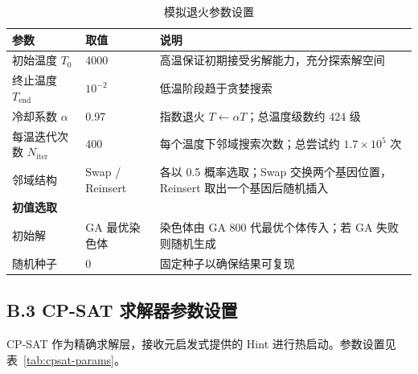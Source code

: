 \documentclass[12pt,a4paper]{ctexart}
\begin{document}
\begin{table}[H]
\centering
\caption{模拟退火参数设置}\label{tab:sa-params}
\begin{tabular}{p{4.5cm} p{3.5cm} p{6.5cm}}
\toprule
\textbf{参数} & \textbf{取值} & \textbf{说明} \\
\midrule
初始温度 $T_0$ & 4000 & 高温保证初期接受劣解能力，充分探索解空间 \\
终止温度 $T_{\mathrm{end}}$ & $10^{-2}$ & 低温阶段趋于贪婪搜索 \\
冷却系数 $\alpha$ & 0.97 & 指数退火 $T\leftarrow\alpha T$；总温度级数约 424 级 \\
每温迭代次数 $N_{\mathrm{iter}}$ & 400 & 每个温度下邻域搜索次数；总尝试约 $1.7\times 10^5$ 次 \\
邻域结构 & Swap / Reinsert & 各以 0.5 概率选取；Swap 交换两个基因位置，Reinsert 取出一个基因后随机插入 \\
\midrule
\multicolumn{3}{l}{\textbf{初值选取}} \\
\midrule
初始解 & GA 最优染色体 & 染色体由 GA 800 代最优个体传入；若 GA 失败则随机生成 \\
随机种子 & 0 & 固定种子以确保结果可复现 \\
\bottomrule
\end{tabular}
\end{table}

\subsection*{B.3 CP-SAT 求解器参数设置}

CP-SAT 作为精确求解层，接收元启发式提供的 Hint 进行热启动。参数设置见表~\ref{tab:cpsat-params}。
\end{document}

